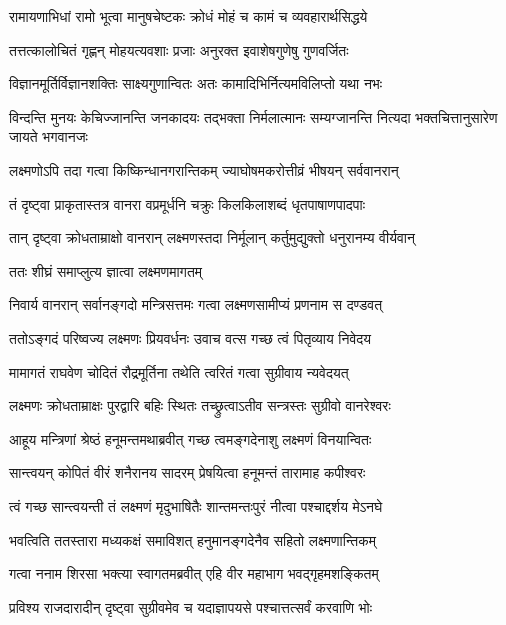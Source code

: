 \twolineshloka
{रामायणाभिधां रामो भूत्वा मानुषचेष्टकः}
{क्रोधं मोहं च कामं च व्यवहारार्थसिद्धये} %

\twolineshloka
{तत्तत्कालोचितं गृह्णन् मोहयत्यवशाः प्रजाः}
{अनुरक्त इवाशेषगुणेषु गुणवर्जितः} %

\twolineshloka
{विज्ञानमूर्तिर्विज्ञानशक्तिः साक्ष्यगुणान्वितः}
{अतः कामादिभिर्नित्यमविलिप्तो यथा नभः} %

\threelineshloka
{विन्दन्ति मुनयः केचिज्जानन्ति जनकादयः}
{तद्भक्ता निर्मलात्मानः सम्यग्जानन्ति नित्यदा}
{भक्तचित्तानुसारेण जायते भगवानजः} %

\twolineshloka
{लक्ष्मणोऽपि तदा गत्वा किष्किन्धानगरान्तिकम्}
{ज्याघोषमकरोत्तीव्रं भीषयन् सर्ववानरान्} %

\twolineshloka
{तं दृष्ट्वा प्राकृतास्तत्र वानरा वप्रमूर्धनि}
{चक्रुः किलकिलाशब्दं धृतपाषाणपादपाः} %

\twolineshloka
{तान् दृष्ट्वा क्रोधताम्राक्षो वानरान् लक्ष्मणस्तदा}
{निर्मूलान् कर्तुमुद्युक्तो धनुरानम्य वीर्यवान्} %

\onelineshloka
{ततः शीघ्रं समाप्लुत्य ज्ञात्वा लक्ष्मणमागतम्} %

\twolineshloka
{निवार्य वानरान् सर्वानङ्गदो मन्त्रिसत्तमः}
{गत्वा लक्ष्मणसामीप्यं प्रणनाम स दण्डवत्} %

\twolineshloka
{ततोऽङ्गदं परिष्वज्य लक्ष्मणः प्रियवर्धनः}
{उवाच वत्स गच्छ त्वं पितृव्याय निवेदय} %

\twolineshloka
{मामागतं राघवेण चोदितं रौद्रमूर्तिना}
{तथेति त्वरितं गत्वा सुग्रीवाय न्यवेदयत्} %

\twolineshloka
{लक्ष्मणः क्रोधताम्राक्षः पुरद्वारि बहिः स्थितः}
{तच्छ्रुत्वाऽतीव सन्त्रस्तः सुग्रीवो वानरेश्वरः} %

\twolineshloka
{आहूय मन्त्रिणां श्रेष्ठं हनूमन्तमथाब्रवीत्}
{गच्छ त्वमङ्गदेनाशु लक्ष्मणं विनयान्वितः} %

\twolineshloka
{सान्त्वयन् कोपितं वीरं शनैरानय सादरम्}
{प्रेषयित्वा हनूमन्तं तारामाह कपीश्वरः} %

\twolineshloka
{त्वं गच्छ सान्त्वयन्ती तं लक्ष्मणं मृदुभाषितैः}
{शान्तमन्तःपुरं नीत्वा पश्चाद्दर्शय मेऽनघे} %

\twolineshloka
{भवत्विति ततस्तारा मध्यकक्षं समाविशत्}
{हनुमानङ्गदेनैव सहितो लक्ष्मणान्तिकम्} %

\twolineshloka
{गत्वा ननाम शिरसा भक्त्या स्वागतमब्रवीत्}
{एहि वीर महाभाग भवद्गृहमशङ्कितम्} %

\twolineshloka
{प्रविश्य राजदारादीन् दृष्ट्वा सुग्रीवमेव च}
{यदाज्ञापयसे पश्चात्तत्सर्वं करवाणि भोः} %

